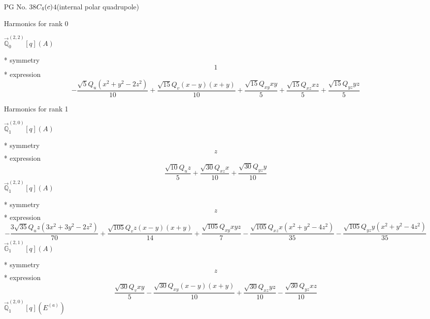 \documentclass[fleqn,8pt]{jsarticle}
\begin{document}
\setcounter{MaxMatrixCols}{32}

\renewcommand{\tablename}{Table~}
\renewcommand{\figurename}{Figure~}
\begin{center}
\LARGE
PG No. 38\quad$C_{\rm 4}(c)$\quad$4$\quad[ tetragonal ] (internal polar quadrupole)
\end{center}

\noindent * Harmonics for rank 0

\noindent\quad $\vec{\mathbb{Q}}_{0}^{(2,2)}[q](A)$

\noindent\quad ** symmetry
\begin{dmath*}
1
\end{dmath*}
\noindent\quad ** expression
\begin{dmath*}
- \frac{\sqrt{5} Q_{u} \left(x^{2} + y^{2} - 2 z^{2}\right)}{10} + \frac{\sqrt{15} Q_{v} \left(x - y\right) \left(x + y\right)}{10} + \frac{\sqrt{15} Q_{xy} x y}{5} + \frac{\sqrt{15} Q_{xz} x z}{5} + \frac{\sqrt{15} Q_{yz} y z}{5}
\end{dmath*}

\noindent * Harmonics for rank 1

\noindent\quad $\vec{\mathbb{Q}}_{1}^{(2,0)}[q](A)$

\noindent\quad ** symmetry
\begin{dmath*}
z
\end{dmath*}
\noindent\quad ** expression
\begin{dmath*}
\frac{\sqrt{10} Q_{u} z}{5} + \frac{\sqrt{30} Q_{xz} x}{10} + \frac{\sqrt{30} Q_{yz} y}{10}
\end{dmath*}
\noindent\quad $\vec{\mathbb{Q}}_{1}^{(2,2)}[q](A)$

\noindent\quad ** symmetry
\begin{dmath*}
z
\end{dmath*}
\noindent\quad ** expression
\begin{dmath*}
- \frac{3 \sqrt{35} Q_{u} z \left(3 x^{2} + 3 y^{2} - 2 z^{2}\right)}{70} + \frac{\sqrt{105} Q_{v} z \left(x - y\right) \left(x + y\right)}{14} + \frac{\sqrt{105} Q_{xy} x y z}{7} - \frac{\sqrt{105} Q_{xz} x \left(x^{2} + y^{2} - 4 z^{2}\right)}{35} - \frac{\sqrt{105} Q_{yz} y \left(x^{2} + y^{2} - 4 z^{2}\right)}{35}
\end{dmath*}
\noindent\quad $\vec{\mathbb{G}}_{1}^{(2,1)}[q](A)$

\noindent\quad ** symmetry
\begin{dmath*}
z
\end{dmath*}
\noindent\quad ** expression
\begin{dmath*}
\frac{\sqrt{30} Q_{v} x y}{5} - \frac{\sqrt{30} Q_{xy} \left(x - y\right) \left(x + y\right)}{10} + \frac{\sqrt{30} Q_{xz} y z}{10} - \frac{\sqrt{30} Q_{yz} x z}{10}
\end{dmath*}
\noindent\quad $\vec{\mathbb{Q}}_{1}^{(2,0)}[q](E^{(a)})$
\end{document}
